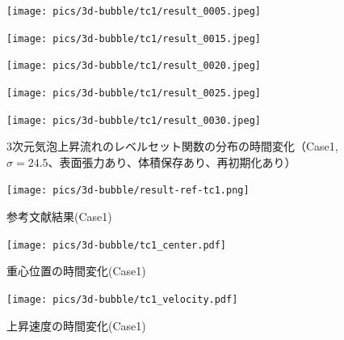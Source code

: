 \begin{figure}[H]
	\centering
	\begin{minipage}[b]{0.16\columnwidth}
	    \centering
	    \texttt{[image: pics/3d-bubble/tc1/result\_0005.jpeg]}
	\end{minipage}
	\begin{minipage}[b]{0.16\columnwidth}
	    \centering
	    \texttt{[image: pics/3d-bubble/tc1/result\_0015.jpeg]}
	\end{minipage}
	\begin{minipage}[b]{0.16\columnwidth}
	    \centering
	    \texttt{[image: pics/3d-bubble/tc1/result\_0020.jpeg]}
	\end{minipage}
	\begin{minipage}[b]{0.16\columnwidth}
	    \centering
	    \texttt{[image: pics/3d-bubble/tc1/result\_0025.jpeg]}
	\end{minipage}
	\begin{minipage}[b]{0.16\columnwidth}
	    \centering
	    \texttt{[image: pics/3d-bubble/tc1/result\_0030.jpeg]}
	\end{minipage}

	\caption{3次元気泡上昇流れのレベルセット関数の分布の時間変化（Case1, $\sigma=24.5$、表面張力あり、体積保存あり、再初期化あり）}
	\label{fig:3d-bubble_result_tc1}
\end{figure}

\begin{figure}[H]
    \centering
	\texttt{[image: pics/3d-bubble/result-ref-tc1.png]}
	\caption{参考文献結果(Case1)\cite{Safi2017}}
	\label{fig:3d-bubble-result-ref}
\end{figure}

\begin{figure}[H]
	\centering
	\begin{minipage}[b]{0.49\columnwidth}
	    \centering
	    \texttt{[image: pics/3d-bubble/tc1\_center.pdf]}
		\caption{重心位置の時間変化(Case1)}
		\label{fig:3d-bubble-center-tc1}
	\end{minipage}
	\begin{minipage}[b]{0.49\columnwidth}
	    \centering
	    \texttt{[image: pics/3d-bubble/tc1\_velocity.pdf]}
		\caption{上昇速度の時間変化(Case1)}
		\label{fig:3d-bubble-velocity-tc1}
	\end{minipage}
\end{figure}

